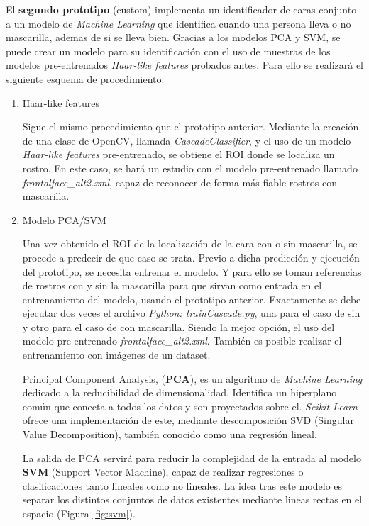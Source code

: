 El \textbf{segundo prototipo} (custom) implementa un identificador de caras conjunto a un modelo de \textit{Machine Learning} que identifica cuando una persona lleva o no mascarilla, ademas de si se lleva bien. Gracias a los modelos PCA y SVM, se puede crear un modelo para su identificación con el uso de muestras de los modelos pre-entrenados \textit{Haar-like features} probados antes. Para ello se realizará el siguiente esquema de procedimiento:

\begin{enumerate}
	\item Haar-like features
	
	Sigue el mismo procedimiento que el prototipo anterior. Mediante la creación de una clase de OpenCV, llamada \textit{CascadeClassifier}, y el uso de un modelo \textit{Haar-like features} pre-entrenado, se obtiene el ROI donde se localiza un rostro. En este caso, se hará un estudio con el modelo pre-entrenado llamado \textit{frontalface\_alt2.xml}, capaz de reconocer de forma más fiable rostros con mascarilla. 
	
	\item Modelo PCA/SVM
	
	Una vez obtenido el ROI de la localización de la cara con o sin mascarilla, se procede a predecir de que caso se trata. Previo a dicha predicción y ejecución del prototipo, se necesita entrenar el modelo. Y para ello se toman referencias de rostros con y sin la mascarilla para que sirvan como entrada en el entrenamiento del modelo, usando el prototipo anterior. Exactamente se debe ejecutar dos veces el archivo \textit{Python: trainCascade.py}, una para el caso de sin y otro para el caso de con mascarilla. Siendo la mejor opción, el uso del modelo pre-entrenado \textit{frontalface\_alt2.xml}. También es posible realizar el entrenamiento con imágenes de un dataset.
	
	Principal Component Analysis, (\textbf{PCA}), es un algoritmo de \textit{Machine Learning} dedicado a la reducibilidad de dimensionalidad. Identifica un hiperplano común que conecta a todos los datos y son proyectados sobre el. \textit{Scikit-Learn} ofrece una implementación de este, mediante descomposición SVD (Singular Value Decomposition), también conocido como una regresión lineal. \cite{geron_2020}
	
	La salida de PCA servirá para reducir la complejidad de la entrada al modelo \textbf{SVM} (Support Vector Machine), capaz de realizar regresiones o clasificaciones tanto lineales como no lineales. La idea tras este modelo es separar los distintos conjuntos de datos existentes mediante lineas rectas en el espacio (Figura \ref{fig:svm}).\cite{geron_2020}
	

\end{enumerate}
